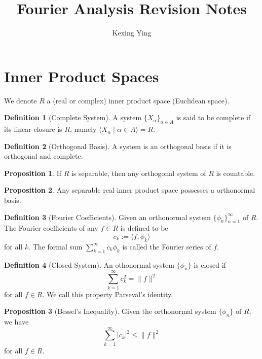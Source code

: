 \documentclass[]{article}
\title{Fourier Analysis Revision Notes}
\author{Kexing Ying}
\theoremstyle{definition}
\newtheorem*{definition}{Definition}
\newtheorem*{proposition}{Proposition}
\begin{document}
\maketitle

\section*{Inner Product Spaces}

We denote \(R\) a (real or complex) inner product space (Euclidean space).

\begin{definition}[Complete System]
  A system \(\{X_\alpha\}_{\alpha \in A}\) is said to be complete if its linear 
  closure is \(R\), namely \(\langle X_\alpha \mid \alpha \in A\rangle = R\).
\end{definition}

\begin{definition}[Orthogonal Basis]
  A system is an orthogonal basis if it is orthogonal and complete.
\end{definition}

\begin{proposition}
  If \(R\) is separable, then any orthogonal system  of \(R\) is countable.
\end{proposition}

\begin{proposition}
  Any separable real inner product space possesses a orthonormal basis.
\end{proposition}

\begin{definition}[Fourier Coefficients]
  Given an orthonormal system \(\{\phi_n\}_{n = 1}^\infty\) of \(R\). The Fourier
  coefficients of any \(f \in R\) is defined to be 
  \[c_k := \langle f, \phi_k\rangle\]
  for all \(k\). The formal sum \(\sum_{k = 1}^\infty c_k \phi_k\) is called the 
  Fourier series of \(f\).
\end{definition}

\begin{definition}[Closed System]
  An othonormal system \(\{\phi_n\}\) is closed if 
  \[\sum_{k = 1}^\infty c_k^2 = \|f\|^2\]
  for all \(f \in R\). We call this property Parseval's identity.
\end{definition}

\begin{proposition}[Bessel's Inequality]
  Given the orthonormal system \(\{\phi_n\}\) of \(R\), we have 
  \[\sum_{k = 1}^\infty |c_k|^2 \le \|f\|^2\]
  for all \(f \in R\).
\end{proposition}
\end{document}

